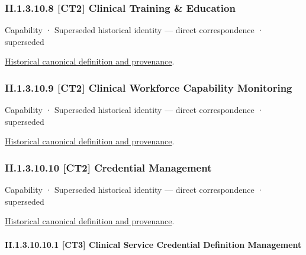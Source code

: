 \subsubsection*{II.1.3.10.8 [CT2] Clinical Training \& Education}
\label{navigation:II.1.3.10.8}

\label{element:df8bff7df9c1469da16cac6a5eb2bf76}
{\small Capability · Superseded historical identity — direct correspondence · superseded}\par
\href{../../../../continuum/strategy/capability/df8bff7df9c1469da16cac6a5eb2bf76.md}{Historical canonical definition and provenance}.\par
\subsubsection*{II.1.3.10.9 [CT2] Clinical Workforce Capability Monitoring}
\label{navigation:II.1.3.10.9}

\label{element:24c015676c254e2e82e8e4287c295179}
{\small Capability · Superseded historical identity — direct correspondence · superseded}\par
\href{../../../../continuum/strategy/capability/24c015676c254e2e82e8e4287c295179.md}{Historical canonical definition and provenance}.\par
\subsubsection*{II.1.3.10.10 [CT2] Credential Management}
\label{navigation:II.1.3.10.10}

\label{element:bab3d0ab6eb748978b962ea20fb31640}
{\small Capability · Superseded historical identity — direct correspondence · superseded}\par
\href{../../../../continuum/strategy/capability/bab3d0ab6eb748978b962ea20fb31640.md}{Historical canonical definition and provenance}.\par
\paragraph*{II.1.3.10.10.1 [CT3] Clinical Service Credential Definition Management}
\label{navigation:II.1.3.10.10.1}

